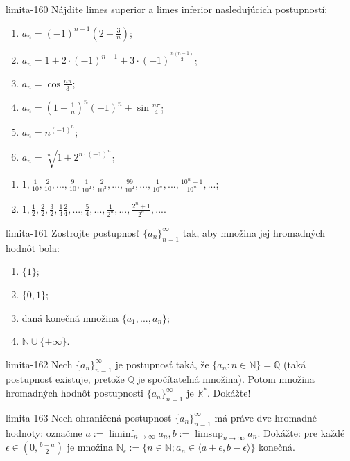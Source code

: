 \begin{defproblem}{limita-160}
Nájdite limes superior a limes inferior nasledujúcich postupností:
\begin{multicols}{2}
\begin{enumerate}
    \item $a_n=(-1)^{n-1}(2+\frac{3}{n})$;
    \item $a_n=1+2 \cdot (-1)^{n+1}+3 \cdot (-1)^{\frac{n(n-1)}{2}}$;
    \item $a_n=\cos \frac{n \pi}{3}$;
    \item $a_n=(1+\frac{1}{n})^n(-1)^n+\sin \frac{n \pi}{4}$;
    \item $a_n=n^{(-1)^n}$;
    \item $a_n=\sqrt[n]{1+2^{n \cdot (-1)^n}}$;
\end{enumerate}
\end{multicols}
\begin{enumerate}[resume]
    \item $1,\frac{1}{10},\frac{2}{10},...,\frac{9}{10},\frac{1}{10^2},\frac{2}{10^2},...,\frac{99}{10^2},...,\frac{1}{10^n},...,\frac{10^n-1}{10^n},...$;
    \item $1,\frac{1}{2},\frac{2}{2},\frac{3}{2},\frac{1}{4}\frac{2}{4},...,\frac{5}{4},...,\frac{1}{2^n},...,\frac{2^n+1}{2^n},... $.
\end{enumerate}
\end{defproblem}

\begin{defproblem}{limita-161}
Zostrojte postupnosť ${\{a_n\}}_{n=1}^\infty$ tak, aby množina jej hromadných hodnôt bola:
\begin{enumerate}
\item $\{ 1\}$;
\item $\{ 0,1\}$;
\item daná konečná množina $\{ a_1,...,a_n\}$;
\item $\mathbb{N} \cup \{ +\infty \}$.
\end{enumerate}
\end{defproblem}

\begin{defproblem}{limita-162}
Nech ${\{a_n\}}_{n=1}^\infty$ je postupnosť taká, že $\{ a_n: n \in \mathbb{N} \}=\mathbb{Q}$ (taká postupnosť existuje, pretože $\mathbb{Q}$ je spočítateľná množina). Potom množina hromadných hodnôt postupnosti ${\{a_n\}}_{n=1}^\infty$ je $\mathbb{R^*}$. Dokážte!
\end{defproblem}

\begin{defproblem}{limita-163}
Nech ohraničená postupnosť ${\{a_n\}}_{n=1}^\infty$ má práve dve hromadné hodnoty: označme $a := \liminf_{n \rightarrow \infty} a_n,b := \limsup_{n \rightarrow \infty} a_n$. Dokážte: pre každé $\epsilon \in (0,\frac{b-a}{2})$ je množina $\mathbb{N_\epsilon} := \{n \in \mathbb{N}; a_n \in \langle a+\epsilon, b-\epsilon \rangle \}$ konečná.
\end{defproblem}

